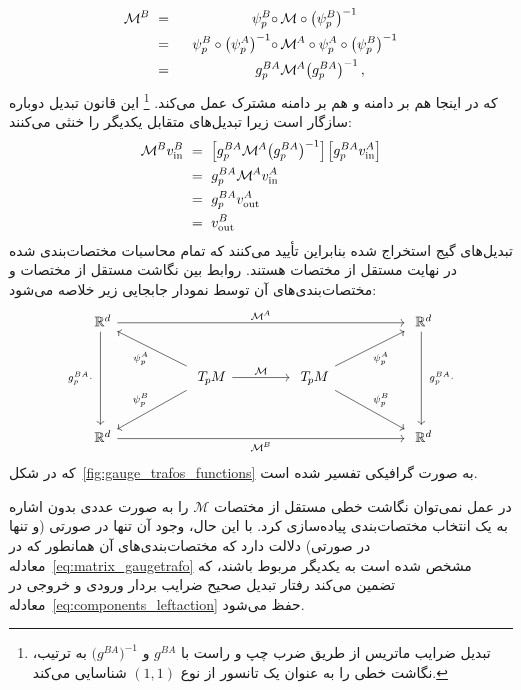 \begin{alignat}{2}\label{eq:matrix_gaugetrafo}
	\mathcal{M}^{\mkern-1mu B}
	\ &=&\ \ \psi_p^B \circ\, &\mathcal{M} \circ \big(\psi_p^B\big)^{-1} \notag \\
	\ &=&\ \ \psi_p^B \circ \big(\psi_p^A\big)^{-1} \circ\, &\mathcal{M}^{\mkern-1mu A} \circ \psi_p^A \circ \big(\psi_p^B\big)^{-1} \notag \\
	\ &=&\ \ g_p^{BA} &\mathcal{M}^{\mkern-1mu A} \big(g_p^{BA}\big)^{-1} \,,
\end{alignat}
که در اینجا هم بر دامنه و هم بر دامنه مشترک عمل می‌کند.%
\footnote{
	تبدیل ضرایب ماتریس از طریق ضرب چپ و راست با $g^{BA}$ و $\big(g^{BA}\big)^{-1}$ به ترتیب، نگاشت خطی را به عنوان یک تانسور از نوع $(1,1)$ شناسایی می‌کند.
}
این قانون تبدیل دوباره سازگار است زیرا تبدیل‌های متقابل یکدیگر را خنثی می‌کنند:
\begin{align}
	\MBB v^B_\text{in}
	\ &=\ \pig[ g_p^{BA} \MAA \big(g_p^{BA}\big)^{-1} \pig]\, \pig[ g_p^{BA} v_\text{in}^A \pig] \notag \\
	\ &=\ g_p^{BA} \MAA v_\text{in}^A \notag \\
	\ &=\ g_p^{BA} v_\text{out}^A \notag \\
	\ &=\ v_\text{out}^B
\end{align}
تبدیل‌های گیج استخراج شده بنابراین تأیید می‌کنند که تمام محاسبات مختصات‌بندی شده در نهایت مستقل از مختصات هستند.
روابط بین نگاشت مستقل از مختصات و مختصات‌بندی‌های آن توسط نمودار جابجایی زیر خلاصه می‌شود:
\begin{equation}\label{eq:linear_map_TpM_diagram}
	\begin{tikzcd}[column sep=50pt, row sep=25pt, font=\normalsize]
		\R^d
		\arrow[dd, "g_p^{BA}\cdot\ "']
		\arrow[rrr, "\MAA"]
		& &[-2ex] &
		\R^d
		\arrow[dd, "\ g_p^{BA}\cdot"]
		\\
		&
		\TpM
		\arrow[ul, "\psi_p^A"]
		\arrow[dl, "\psi_p^B"']
		\arrow[r, "\mathcal{M}"]
		&
		\TpM
		\arrow[ur, "\psi_p^A"']
		\arrow[dr, "\psi_p^B"]
		\\
		\R^d
		\arrow[rrr, "\MBB"']
		& & &
		\R^d
	\end{tikzcd}
\end{equation}
که در شکل~\ref{fig:gauge_trafos_functions} به صورت گرافیکی تفسیر شده است.

در عمل نمی‌توان نگاشت خطی مستقل از مختصات $\mathcal{M}$ را به صورت عددی بدون اشاره به یک انتخاب مختصات‌بندی پیاده‌سازی کرد.
با این حال، وجود آن تنها در صورتی (و تنها در صورتی) دلالت دارد که مختصات‌بندی‌های آن همانطور که در معادله~\eqref{eq:matrix_gaugetrafo} مشخص شده است به یکدیگر مربوط باشند، که تضمین می‌کند رفتار تبدیل صحیح ضرایب بردار ورودی و خروجی در معادله~\eqref{eq:components_leftaction} حفظ می‌شود.


